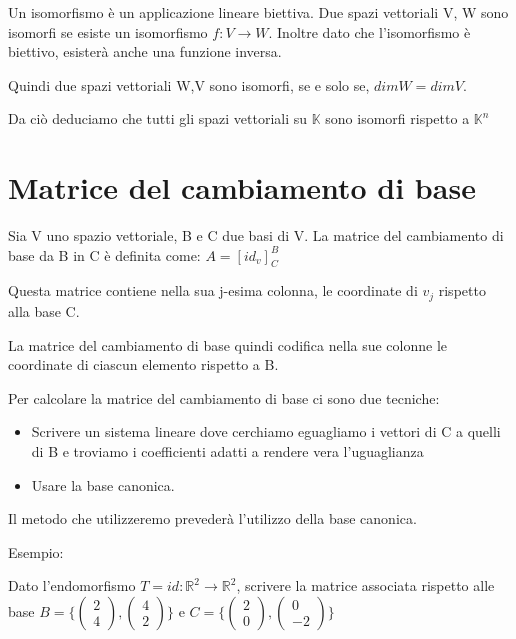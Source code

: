 \documentclass[a4paper, 10pt]{article}
\begin{document}
Un isomorfismo è un applicazione lineare biettiva. Due spazi vettoriali V, W sono isomorfi se esiste un isomorfismo $f: V \rightarrow W$. Inoltre dato che l'isomorfismo è biettivo, esisterà anche una funzione inversa.

Quindi due spazi vettoriali W,V sono isomorfi, se e solo se, $dimW = dimV$.

Da ciò deduciamo che tutti gli spazi vettoriali su $\mathbb{K}$ sono isomorfi rispetto a $\mathbb{K}^n$

\section{Matrice del cambiamento di base}

Sia V uno spazio vettoriale, B e C due basi di V. La matrice del cambiamento di base da B in C è definita come: $A=[id_v]_C^B$

Questa matrice contiene nella sua j-esima colonna, le coordinate di $v_j$ rispetto alla base C.

La matrice del cambiamento di base quindi codifica nella sue colonne le coordinate di ciascun elemento rispetto a B.

Per calcolare la matrice del cambiamento di base ci sono due tecniche:

\begin{itemize}
	\item Scrivere un sistema lineare dove cerchiamo eguagliamo i vettori di C a quelli di B e troviamo i coefficienti adatti a rendere vera l'uguaglianza
	\item Usare la base canonica.
\end{itemize}

Il metodo che utilizzeremo prevederà l'utilizzo della base canonica.

Esempio:

Dato l'endomorfismo $T=id: \mathbb{R}^2 \rightarrow \mathbb{R}^2$, scrivere la matrice associata rispetto alle base $B=\{\begin{pmatrix}
	2 \\
	4 
\end{pmatrix}, \begin{pmatrix}
4 \\
2 
\end{pmatrix}\}$ e $C=\{\begin{pmatrix}
2 \\
0 
\end{pmatrix}, \begin{pmatrix}
0 \\
-2 
\end{pmatrix}\}$
\end{document}
